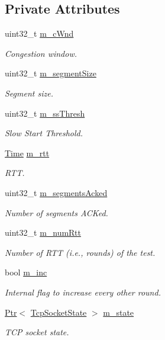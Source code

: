 \subsection*{Private Attributes}
\begin{DoxyCompactItemize}
\item 
uint32\+\_\+t \hyperlink{classTcpVenoTest_aa65e90c7ba8b3f0779f2afbad9a383e1}{m\+\_\+c\+Wnd}
\begin{DoxyCompactList}\small\item\em Congestion window. \end{DoxyCompactList}\item 
uint32\+\_\+t \hyperlink{classTcpVenoTest_abd2a3231c1c2efc9aed967bc205a5ae2}{m\+\_\+segment\+Size}
\begin{DoxyCompactList}\small\item\em Segment size. \end{DoxyCompactList}\item 
uint32\+\_\+t \hyperlink{classTcpVenoTest_ab687dc972314acea4861c499a99ed5f1}{m\+\_\+ss\+Thresh}
\begin{DoxyCompactList}\small\item\em Slow Start Threshold. \end{DoxyCompactList}\item 
\hyperlink{classns3_1_1Time}{Time} \hyperlink{classTcpVenoTest_a0e786084324c078f6a58b8fdf0d61b60}{m\+\_\+rtt}
\begin{DoxyCompactList}\small\item\em R\+TT. \end{DoxyCompactList}\item 
uint32\+\_\+t \hyperlink{classTcpVenoTest_a7614249ca9888a1a8361554990318a2b}{m\+\_\+segments\+Acked}
\begin{DoxyCompactList}\small\item\em Number of segments A\+C\+Ked. \end{DoxyCompactList}\item 
uint32\+\_\+t \hyperlink{classTcpVenoTest_a38d25d99a350ac0802bdb80052b4cfd9}{m\+\_\+num\+Rtt}
\begin{DoxyCompactList}\small\item\em Number of R\+TT (i.\+e., rounds) of the test. \end{DoxyCompactList}\item 
bool \hyperlink{classTcpVenoTest_a447f72854c411771e834e6084fe9b0c4}{m\+\_\+inc}
\begin{DoxyCompactList}\small\item\em Internal flag to increase every other round. \end{DoxyCompactList}\item 
\hyperlink{classns3_1_1Ptr}{Ptr}$<$ \hyperlink{classns3_1_1TcpSocketState}{Tcp\+Socket\+State} $>$ \hyperlink{classTcpVenoTest_abb83a5490fca559c6233283e33a05c26}{m\+\_\+state}
\begin{DoxyCompactList}\small\item\em T\+CP socket state. \end{DoxyCompactList}\end{DoxyCompactItemize}
